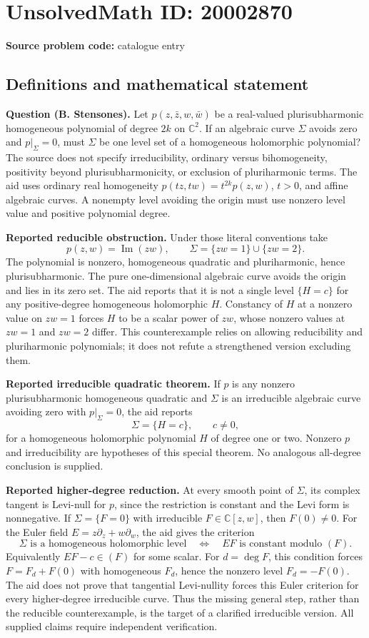 \documentclass[11pt]{article}
\newcommand{\C}{\mathbb{C}}
\begin{document}
\section*{UnsolvedMath ID: 20002870}
\textbf{Source problem code:} catalogue entry
\subsection{Definitions and mathematical statement}
\textbf{Question (B. Stensones).} Let \(p(z,\bar z,w,\bar w)\) be a real-valued plurisubharmonic homogeneous polynomial of degree \(2k\) on \(\C^2\). If an algebraic curve \(\Sigma\) avoids zero and \(p|_\Sigma=0\), must \(\Sigma\) be one level set of a homogeneous holomorphic polynomial? The source does not specify irreducibility, ordinary versus bihomogeneity, positivity beyond plurisubharmonicity, or exclusion of pluriharmonic terms. The aid uses ordinary real homogeneity \(p(tz,tw)=t^{2k}p(z,w)\), \(t>0\), and affine algebraic curves. A nonempty level avoiding the origin must use nonzero level value and positive polynomial degree.

\textbf{Reported reducible obstruction.} Under those literal conventions take
\[
 p(z,w)=\operatorname{Im}(zw),\qquad
 \Sigma=\{zw=1\}\cup\{zw=2\}.
\]
The polynomial is nonzero, homogeneous quadratic and pluriharmonic, hence plurisubharmonic. The pure one-dimensional algebraic curve avoids the origin and lies in its zero set. The aid reports that it is not a single level \(\{H=c\}\) for any positive-degree homogeneous holomorphic \(H\). Constancy of \(H\) at a nonzero value on \(zw=1\) forces \(H\) to be a scalar power of \(zw\), whose nonzero values at \(zw=1\) and \(zw=2\) differ. This counterexample relies on allowing reducibility and pluriharmonic polynomials; it does not refute a strengthened version excluding them.

\textbf{Reported irreducible quadratic theorem.} If \(p\) is any nonzero plurisubharmonic homogeneous quadratic and \(\Sigma\) is an irreducible algebraic curve avoiding zero with \(p|_\Sigma=0\), the aid reports
\[
 \Sigma=\{H=c\},\qquad c\ne0,
\]
for a homogeneous holomorphic polynomial \(H\) of degree one or two. Nonzero \(p\) and irreducibility are hypotheses of this special theorem. No analogous all-degree conclusion is supplied.

\textbf{Reported higher-degree reduction.} At every smooth point of \(\Sigma\), its complex tangent is Levi-null for \(p\), since the restriction is constant and the Levi form is nonnegative. If \(\Sigma=\{F=0\}\) with irreducible \(F\in\C[z,w]\), then \(F(0)\ne0\). For the Euler field \(E=z\partial_z+w\partial_w\), the aid gives the criterion
\[
 \Sigma\text{ is a homogeneous holomorphic level}
 \quad\Longleftrightarrow\quad
 EF\text{ is constant modulo }(F).
\]
Equivalently \(EF-c\in(F)\) for some scalar. For \(d=\deg F\), this condition forces \(F=F_d+F(0)\) with homogeneous \(F_d\), hence the nonzero level \(F_d=-F(0)\). The aid does not prove that tangential Levi-nullity forces this Euler criterion for every higher-degree irreducible curve. Thus the missing general step, rather than the reducible counterexample, is the target of a clarified irreducible version. All supplied claims require independent verification.
\end{document}

